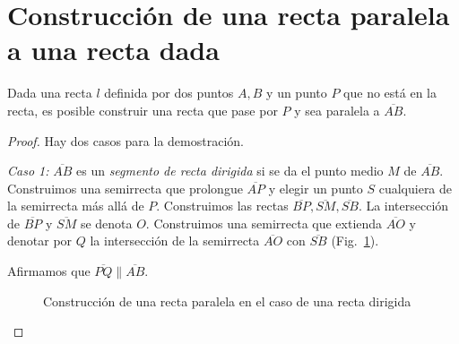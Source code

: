\section{Construcción de una recta paralela a una recta dada}\label{s.parallel}

\begin{theorem}\label{thm.straight-parallel}
Dada una recta $l$ definida por dos puntos $A,B$ y un punto $P$ que no está en la recta, es posible construir una recta que pase por $P$ y sea paralela a $\overline{AB}$.
\end{theorem}

\begin{proof}

Hay dos casos para la demostración.

\textit{Caso 1:}
$\overline{AB}$ es un \emph{segmento de recta dirigida} si se da el punto medio $M$ de $\overline{AB}$.  Construimos una semirrecta que prolongue $\overline{AP}$ y elegir un punto $S$ cualquiera de la semirrecta más allá de $P$. Construimos las rectas $\overline{BP}, \overline{SM}, \overline{SB}$. La intersección de $\overline{BP}$ y $\overline{SM}$ se denota $O$. Construimos una semirrecta que extienda $\overline{AO}$ y denotar por $Q$ la intersección de la semirrecta $\overline{AO}$ con $\overline{SB}$ (Fig.~\ref{f.se-parallel-directed}).

Afirmamos que $\overline{PQ}\parallel \overline{AB}$. 

\begin{figure}[ht]
\begin{center}
\end{center}
\caption{Construcción de una recta paralela en el caso de una recta dirigida}\label{f.se-parallel-directed}
\end{figure}


\end{proof}

